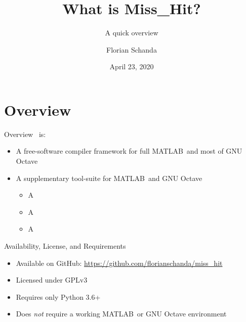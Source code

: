 \documentclass{beamer}
\author{Florian Schanda}
\title{What is {\sc Miss\_Hit}?}
\subtitle{A quick overview}
\date{April 23, 2020}
\newcommand{\mh}[0]{{\sc\structure{Miss\_Hit}}}
\begin{document}
\maketitle

{}

\section{Overview}
\begin{frame}{Overview}
  \mh~is:
  \begin{itemize}
  \item A free-software compiler framework for full
    MATLAB\texttrademark\ and most of GNU Octave
    \pause
  \item A supplementary tool-suite for MATLAB\texttrademark\ and GNU
    Octave
    \begin{itemize}
    \item A 
    \item A 
    \item A 
    \end{itemize}
  \end{itemize}
\end{frame}

\begin{frame}{Availability, License, and Requirements}
  \begin{itemize}
  \item Available on GitHub: \url{https://github.com/florianschanda/miss_hit}
  \item Licensed under GPLv3
    \pause
  \item Requires only Python 3.6+
  \item Does \emph{not} require a working MATLAB\texttrademark\ or GNU
    Octave environment
  \end{itemize}
\end{frame}
\end{document}
